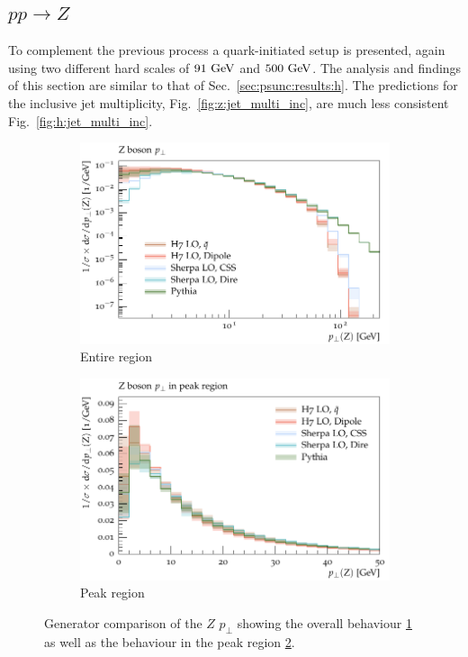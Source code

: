 \subsection{$pp\to Z$}
\label{sec:psunc:results:z}
To complement the previous process a quark-initiated setup is presented, again
using two different hard scales of $91\ {\rm GeV}$ and $500\ {\rm GeV}$. The
analysis and findings of this section are similar to that of
Sec.~\ref{sec:psunc:results:h}. The predictions for the inclusive jet
multiplicity, Fig.~\ref{fig:z:jet_multi_inc}, are much less consistent
Fig.~\ref{fig:h:jet_multi_inc}.
\begin{figure}[h]
  \centering
    \begin{subfigure}[t]{0.49\textwidth}
    \includegraphics[width=\textwidth]{plots/Z-91-MuShower/LH_Z/X_pT.pdf}
    \caption{Entire region}
    \label{fig:z:pt_full}
  \end{subfigure}
%
  \begin{subfigure}[t]{0.49\textwidth}
    \includegraphics[width=\textwidth]{plots/Z-91-MuShower/LH_Z/X_pT_peak.pdf}
    \caption{Peak region}
    \label{fig:z:pt_peak}
  \end{subfigure}
  \caption{Generator comparison of the $Z$ $p_\perp$ showing the overall behaviour \ref{fig:z:pt_full} as well as the behaviour in the peak region \ref{fig:z:pt_peak}.}
  \label{fig:z:pt}
\end{figure}

